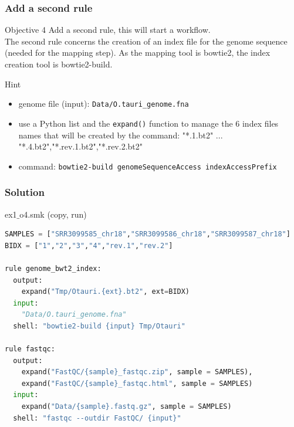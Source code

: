 \begin{frame}[containsverbatim]
\frametitle{Add a second rule}
\begin{exampleblock}{Objective 4}
Add a second rule, this will start a workflow. \\
The second rule concerns the creation of an index file for the genome sequence (needed for the mapping step). As the mapping tool is bowtie2, the index creation tool is bowtie2-build.
\end{exampleblock}
\begin{exampleblock}{Hint}
\begin{itemize}
    \item genome file (input): \verb|Data/O.tauri_genome.fna|
    \item use a Python list and the \verb|expand()| function to manage the 6 index files names that will be created by the command: "*.1.bt2" ... "*.4.bt2","*.rev.1.bt2","*.rev.2.bt2"
    \item command: \verb|bowtie2-build genomeSequenceAccess indexAccessPrefix|
\end{itemize}
\end{exampleblock}
\end{frame}
\begin{frame}[containsverbatim]
\frametitle{Solution}
\begin{exampleblock}{ex1$\_$o4.smk (copy, run)}
\begin{lstlisting}[language=python]
SAMPLES = ["SRR3099585_chr18","SRR3099586_chr18","SRR3099587_chr18"]
BIDX = ["1","2","3","4","rev.1","rev.2"]

rule genome_bwt2_index:
  output:
    expand("Tmp/Otauri.{ext}.bt2", ext=BIDX)
  input:
    "Data/O.tauri_genome.fna"
  shell: "bowtie2-build {input} Tmp/Otauri"

rule fastqc:
  output:
    expand("FastQC/{sample}_fastqc.zip", sample = SAMPLES),
    expand("FastQC/{sample}_fastqc.html", sample = SAMPLES)
  input:
    expand("Data/{sample}.fastq.gz", sample = SAMPLES)
  shell: "fastqc --outdir FastQC/ {input}"
\end{lstlisting}
\end{exampleblock}
\end{frame}
